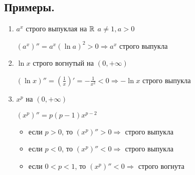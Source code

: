 \subsection*{Примеры.}
\begin{enumerate}
    \item $a^x$ строго выпуклая на $\mathbb{R}$ \qquad $a \neq 1, a > 0$
    
    $(a^x)'' = a^x(\ln{a})^2 > 0 \Longrightarrow a^x$ строго выпукла
    \item $\ln{x}$ строго вогнутый на $(0, +\infty)$
    
    $(\ln{x})'' = (\frac{1}{x})' = - \frac{1}{x^2} < 0 \Longrightarrow - \ln{x}$ строго выпукла
    \item $x^p$ на $(0, +\infty)$
    
    $(x^p)'' = p(p - 1)x^{p - 2}$ 

    \begin{itemize}
        \item[] если $p > 0$, то $(x^p)'' > 0 \Longrightarrow$ строго выпукла
        \item[] если $p < 0$, то $(x^p)'' < 0 \Longrightarrow$ строго выпукла 
        \item[] если $0 < p < 1$, то $(x^p)'' < 0 \Longrightarrow$ строго вогнута
    \end{itemize}
\end{enumerate}
